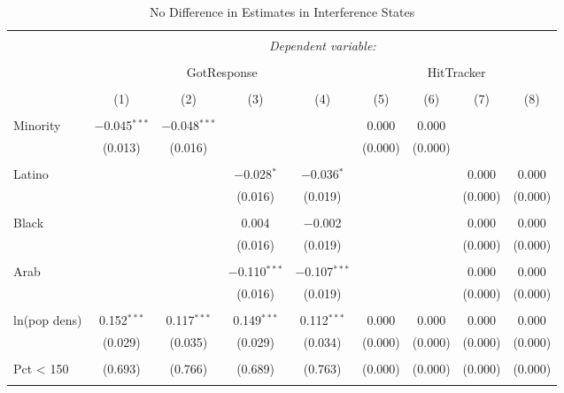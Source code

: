 
\begin{table}[p] \centering 
  \caption{No Difference in Estimates in Interference States} 
  \label{x:tab:spillover} 
\footnotesize 
\begin{tabular}{@{\extracolsep{1pt}}lcccccccc} 
\\[-1.8ex]\hline 
\hline \\[-1.8ex] 
 & \multicolumn{8}{c}{\textit{Dependent variable:}} \\ 
\cline{2-9} 
\\[-1.8ex] & \multicolumn{4}{c}{GotResponse} & \multicolumn{4}{c}{HitTracker} \\ 
\\[-1.8ex] & (1) & (2) & (3) & (4) & (5) & (6) & (7) & (8)\\ 
\hline \\[-1.8ex] 
 Minority & $-$0.045$^{***}$ & $-$0.048$^{***}$ &  &  & 0.000 & 0.000 &  &  \\ 
  & (0.013) & (0.016) &  &  & (0.000) & (0.000) &  &  \\ 
  & & & & & & & & \\ 
 Latino &  &  & $-$0.028$^{*}$ & $-$0.036$^{*}$ &  &  & 0.000 & 0.000 \\ 
  &  &  & (0.016) & (0.019) &  &  & (0.000) & (0.000) \\ 
  & & & & & & & & \\ 
 Black &  &  & 0.004 & $-$0.002 &  &  & 0.000 & 0.000 \\ 
  &  &  & (0.016) & (0.019) &  &  & (0.000) & (0.000) \\ 
  & & & & & & & & \\ 
 Arab &  &  & $-$0.110$^{***}$ & $-$0.107$^{***}$ &  &  & 0.000 & 0.000 \\ 
  &  &  & (0.016) & (0.019) &  &  & (0.000) & (0.000) \\ 
  & & & & & & & & \\ 
 ln(pop dens) & 0.152$^{***}$ & 0.117$^{***}$ & 0.149$^{***}$ & 0.112$^{***}$ & 0.000 & 0.000 & 0.000 & 0.000 \\ 
  & (0.029) & (0.035) & (0.029) & (0.034) & (0.000) & (0.000) & (0.000) & (0.000) \\ 
  & & & & & & & & \\ 
 Pct < 150%
  & (0.693) & (0.766) & (0.689) & (0.763) & (0.000) & (0.000) & (0.000) & (0.000) \\ 
  & & & & & & & & \\ 

\end{tabular}
\end{table}
